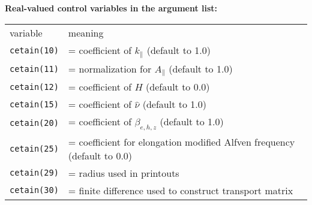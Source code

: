 \renewcommand{\arraystretch}{1.0}
\begin{center}
{\bf Real-valued control variables in the argument list:}
\begin{tabular}{lp{4.0in}}
variable & meaning \\
{\tt cetain(10)} & = coefficient of $ k_\parallel $ (default to 1.0) \\
{\tt cetain(11)} & = normalization for $ A_\parallel $ (default to 1.0) \\
{\tt cetain(12)} & = coefficient of $H$ (default to 0.0) \\
{\tt cetain(15)} & = coefficient of $ \hat{\nu} $ (default to 1.0) \\
{\tt cetain(20)} & = coefficient of $ \beta_{e,h,z} $ (default to 1.0) \\
{\tt cetain(25)} & = coefficient for elongation modified Alfven frequency 
(default to 0.0) \\
{\tt cetain(29)} & = radius used in printouts \\
{\tt cetain(30)} & = finite difference used to construct
                   transport matrix \\
\end{tabular}
\end{center}



